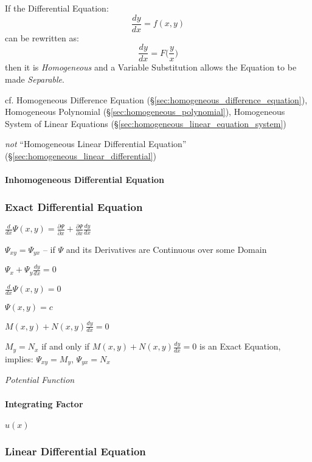 If the Differential Equation:
\[
  \frac{dy}{dx} = f(x,y)
\]
can be rewritten as:
\[
  \frac{dy}{dx} = F\Big(\frac{y}{x}\Big)
\]
then it is \emph{Homogeneous} and a Variable Substitution allows the Equation to
be made \emph{Separable}.

cf. Homogeneous Difference Equation
(\S\ref{sec:homogeneous_difference_equation}), Homogeneous Polynomial
(\S\ref{sec:homogeneous_polynomial}), Homogeneous System of Linear Equations
(\S\ref{sec:homogeneous_linear_equation_system})

\emph{not} ``Homogeneous Linear Differential Equation''
(\S\ref{sec:homogeneous_linear_differential})



\paragraph{Inhomogeneous Differential Equation}
\label{sec:inhomogeneous_differential_equation}



\subsubsection{Exact Differential Equation}\label{sec:exact_equation}

$\frac{d}{dx}\Psi(x,y) = \frac{\partial{\Psi}}{\partial{x}}
  + \frac{\partial{\Psi}}{\partial{x}}\frac{dy}{dx}$

$\Psi_{xy} = \Psi_{yx}$ -- if $\Psi$ and its Derivatives are Continuous over
some Domain

$\Psi_x + \Psi_y \frac{dy}{dx} = 0$

$\frac{d}{dx}\Psi(x,y) = 0$

$\Psi(x,y) = c$

$M(x,y) + N(x,y)\frac{dy}{dx} = 0$

$M_y = N_x$ if and only if $M(x,y) + N(x,y)\frac{dy}{dx} = 0$ is an Exact
Equation, implies: $\Psi_{xy} = M_y$, $\Psi_{yx} = N_x$

\emph{Potential Function}



\paragraph{Integrating Factor}\label{sec:integrating_factor}\hfill

$u(x)$



\subsubsection{Linear Differential Equation}
\label{sec:linear_differential_equation}


